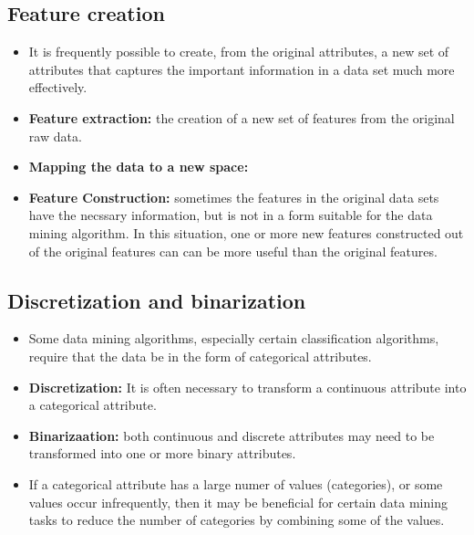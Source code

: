 	\subsection{Feature creation}
		\begin{itemize}
			\item It is frequently possible to create, from the original attributes, a new set
			of attributes that captures the important information in a data set much more
			effectively. 
			\item {\bf Feature extraction:} the creation of a new set of features from the 
			original raw data. 
			\item {\bf Mapping the data to a new space:} 
			\item {\bf Feature Construction: } sometimes the features in the original data sets have
			the necssary information, but is not in a form suitable for the data mining algorithm.
			In this situation, one or more new features constructed out of the original features can
			can be more useful than the original features. 
		\end{itemize}

	\subsection{Discretization and binarization}
		\begin{itemize}
			\item Some data mining algorithms, especially certain classification algorithms, 
			require that the data be in the form of categorical attributes. 
			\item {\bf Discretization:} It is often necessary to transform a continuous attribute into a categorical attribute.
			\item {\bf Binarizaation:} both continuous and discrete attributes may need to be 
			transformed into one or more binary attributes.
			\item If a categorical attribute has a large numer of values (categories), or some
			values occur infrequently, then it may be beneficial for certain data mining tasks
			to reduce the number of categories by combining some of the values. 
		\end{itemize}

